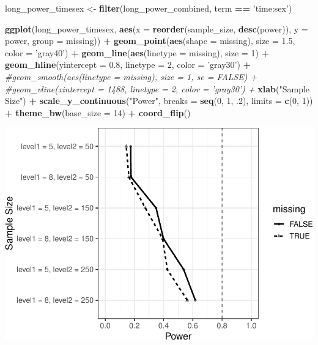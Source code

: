 \documentclass[man]{apa6}
\newenvironment{Shaded}{\begin{snugshade}}{\end{snugshade}}
\newcommand{\CommentTok}[1]{\textcolor[rgb]{0.56,0.35,0.01}{\textit{#1}}}
\newcommand{\DataTypeTok}[1]{\textcolor[rgb]{0.13,0.29,0.53}{#1}}
\newcommand{\DecValTok}[1]{\textcolor[rgb]{0.00,0.00,0.81}{#1}}
\newcommand{\FloatTok}[1]{\textcolor[rgb]{0.00,0.00,0.81}{#1}}
\newcommand{\KeywordTok}[1]{\textcolor[rgb]{0.13,0.29,0.53}{\textbf{#1}}}
\newcommand{\NormalTok}[1]{#1}
\newcommand{\OperatorTok}[1]{\textcolor[rgb]{0.81,0.36,0.00}{\textbf{#1}}}
\newcommand{\StringTok}[1]{\textcolor[rgb]{0.31,0.60,0.02}{#1}}
\begin{document}
\begin{Shaded}
\begin{Highlighting}[]
\NormalTok{long_power_timesex <-}\StringTok{ }\KeywordTok{filter}\NormalTok{(long_power_combined, term }\OperatorTok{==}\StringTok{ 'time:sex'}\NormalTok{)}

\KeywordTok{ggplot}\NormalTok{(long_power_timesex, }\KeywordTok{aes}\NormalTok{(}\DataTypeTok{x =} \KeywordTok{reorder}\NormalTok{(sample_size, }\KeywordTok{desc}\NormalTok{(power)), }\DataTypeTok{y =}\NormalTok{ power, }
                          \DataTypeTok{group =}\NormalTok{ missing)) }\OperatorTok{+}\StringTok{ }
\StringTok{  }\KeywordTok{geom_point}\NormalTok{(}\KeywordTok{aes}\NormalTok{(}\DataTypeTok{shape =}\NormalTok{ missing), }\DataTypeTok{size =} \FloatTok{1.5}\NormalTok{, }\DataTypeTok{color =} \StringTok{'gray40'}\NormalTok{) }\OperatorTok{+}\StringTok{ }
\StringTok{  }\KeywordTok{geom_line}\NormalTok{(}\KeywordTok{aes}\NormalTok{(}\DataTypeTok{linetype =}\NormalTok{ missing), }\DataTypeTok{size =} \DecValTok{1}\NormalTok{) }\OperatorTok{+}
\StringTok{  }\KeywordTok{geom_hline}\NormalTok{(}\DataTypeTok{yintercept =} \FloatTok{0.8}\NormalTok{, }\DataTypeTok{linetype =} \DecValTok{2}\NormalTok{, }\DataTypeTok{color =} \StringTok{'gray30'}\NormalTok{) }\OperatorTok{+}\StringTok{ }
\StringTok{  }\CommentTok{#geom_smooth(aes(linetype = missing), size = 1, se = FALSE) +}
\StringTok{  }\CommentTok{#geom_vline(xintercept = 1488, linetype = 2, color = 'gray30') +}
\StringTok{  }\KeywordTok{xlab}\NormalTok{(}\StringTok{"Sample Size"}\NormalTok{) }\OperatorTok{+}\StringTok{ }
\StringTok{  }\KeywordTok{scale_y_continuous}\NormalTok{(}\StringTok{"Power"}\NormalTok{, }\DataTypeTok{breaks =} \KeywordTok{seq}\NormalTok{(}\DecValTok{0}\NormalTok{, }\DecValTok{1}\NormalTok{, }\FloatTok{.2}\NormalTok{), }\DataTypeTok{limits =} \KeywordTok{c}\NormalTok{(}\DecValTok{0}\NormalTok{, }\DecValTok{1}\NormalTok{)) }\OperatorTok{+}
\StringTok{  }\KeywordTok{theme_bw}\NormalTok{(}\DataTypeTok{base_size =} \DecValTok{14}\NormalTok{) }\OperatorTok{+}\StringTok{ }
\StringTok{  }\KeywordTok{coord_flip}\NormalTok{()}
\end{Highlighting}
\end{Shaded}

\includegraphics{power_simulation_files/figure-latex/long-power-curve-ts-1.pdf}
\end{document}
